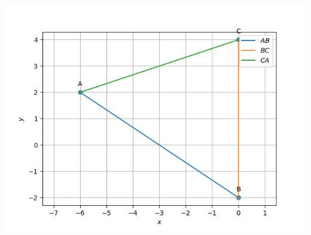 \documentclass[article,12pt]{IEEEtran}
\begin{document}
\includegraphics[width=\columnwidth]{./figs/triangle.png}
\newpage
\end{document}
